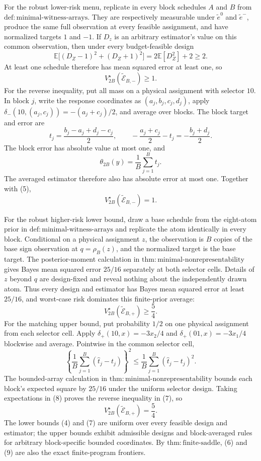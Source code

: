 For the robust lower-risk menu, replicate in every block schedules \(A\) and \(B\) from \(\mathrm{def{:}minimal\text{-}witness\text{-}arrays}\).  They are respectively measurable under \(\widetilde e^0\) and \(\widetilde e^-\), produce the same full observation at every feasible assignment, and have normalized targets \(1\) and \(-1\).  If \(D_z\) is an arbitrary estimator's value on this common observation, then under every budget-feasible design
\[
 \mathbb E\bigl[(D_Z-1)^2+(D_Z+1)^2\bigr]
 =2\mathbb E[D_Z^2]+2\ge2. \tag{4}
\]
At least one schedule therefore has mean squared error at least one, so
\[
 V_{2B}^\star(\widetilde{\mathcal E}_{B,-})\ge1. \tag{5}
\]
For the reverse inequality, put all mass on a physical assignment with selector \(10\).  In block \(j\), write the response coordinates as \((a_j,b_j,c_j,d_j)\), apply \(\delta_-(10,(a_j,c_j))=-(a_j+c_j)/2\), and average over blocks.  The block target and error are
\[
 t_j=\frac{b_j-a_j+d_j-c_j}{2},
 \qquad
 -\frac{a_j+c_j}{2}-t_j=-\frac{b_j+d_j}{2}.
\]
The block error has absolute value at most one, and
\[
 \theta_{2B}(y)=\frac1B\sum_{j=1}^Bt_j.
\]
The averaged estimator therefore also has absolute error at most one.  Together with (5),
\[
 V_{2B}^\star(\widetilde{\mathcal E}_{B,-})=1. \tag{6}
\]

For the robust higher-risk lower bound, draw a base schedule from the eight-atom prior in \(\mathrm{def{:}minimal\text{-}witness\text{-}arrays}\) and replicate the atom identically in every block.  Conditional on a physical assignment \(z\), the observation is \(B\) copies of the base sign observation at \(q=\rho_B(z)\), and the normalized target is the base target.  The posterior-moment calculation in \(\mathrm{thm{:}minimal\text{-}nonrepresentability}\) gives Bayes mean squared error \(25/16\) separately at both selector cells.  Details of \(z\) beyond \(q\) are design-fixed and reveal nothing about the independently drawn atom.  Thus every design and estimator has Bayes mean squared error at least \(25/16\), and worst-case risk dominates this finite-prior average:
\[
 V_{2B}^\star(\widetilde{\mathcal E}_{B,+})\ge\frac54. \tag{7}
\]
For the matching upper bound, put probability \(1/2\) on one physical assignment from each selector cell.  Apply \(\delta_+(10,x)=-3x_2/4\) and \(\delta_+(01,x)=-3x_1/4\) blockwise and average.  Pointwise in the common selector cell,
\[
 \left\{\frac1B\sum_{j=1}^B(\widehat t_j-t_j)\right\}^2
 \le\frac1B\sum_{j=1}^B(\widehat t_j-t_j)^2. \tag{8}
\]
The bounded-array calculation in \(\mathrm{thm{:}minimal\text{-}nonrepresentability}\) bounds each block's expected square by \(25/16\) under the uniform selector design.  Taking expectations in (8) proves the reverse inequality in (7), so
\[
 V_{2B}^\star(\widetilde{\mathcal E}_{B,+})=\frac54. \tag{9}
\]
The lower bounds (4) and (7) are uniform over every feasible design and estimator; the upper bounds exhibit admissible designs and block-averaged rules for arbitrary block-specific bounded coordinates.  By \(\mathrm{thm{:}finite\text{-}saddle}\), (6) and (9) are also the exact finite-program frontiers.

